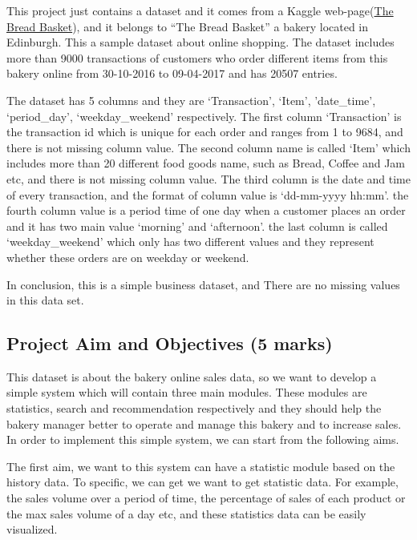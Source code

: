 \documentclass[11pt]{article}
\begin{document}
This project just contains a dataset and it comes from a Kaggle
web-page(\href{https://www.kaggle.com/mittalvasu95/the-bread-basket}{The
Bread Basket}), and it belongs to ``The Bread Basket'' a bakery located
in Edinburgh. This a sample dataset about online shopping. The dataset
includes more than 9000 transactions of customers who order different
items from this bakery online from 30-10-2016 to 09-04-2017 and has
20507 entries.

The dataset has 5 columns and they are `Transaction', `Item',
'date\_time', `period\_day', `weekday\_weekend' respectively. The first
column `Transaction' is the transaction id which is unique for each
order and ranges from 1 to 9684, and there is not missing column value.
The second column name is called `Item' which includes more than 20
different food goods name, such as Bread, Coffee and Jam etc, and there
is not missing column value. The third column is the date and time of
every transaction, and the format of column value is `dd-mm-yyyy hh:mm'.
the fourth column value is a period time of one day when a customer
places an order and it has two main value `morning' and `afternoon'. the
last column is called `weekday\_weekend' which only has two different
values and they represent whether these orders are on weekday or
weekend.

In conclusion, this is a simple business dataset, and There are no
missing values in this data set.

\hypertarget{project-aim-and-objectives-5-marks}{%
\subsection{Project Aim and Objectives (5
marks)}\label{project-aim-and-objectives-5-marks}}

This dataset is about the bakery online sales data, so we want to
develop a simple system which will contain three main modules. These
modules are statistics, search and recommendation respectively and they
should help the bakery manager better to operate and manage this bakery
and to increase sales. In order to implement this simple system, we can
start from the following aims.

The first aim, we want to this system can have a statistic module based
on the history data. To specific, we can get we want to get statistic
data. For example, the sales volume over a period of time, the
percentage of sales of each product or the max sales volume of a day
etc, and these statistics data can be easily visualized.
\end{document}
